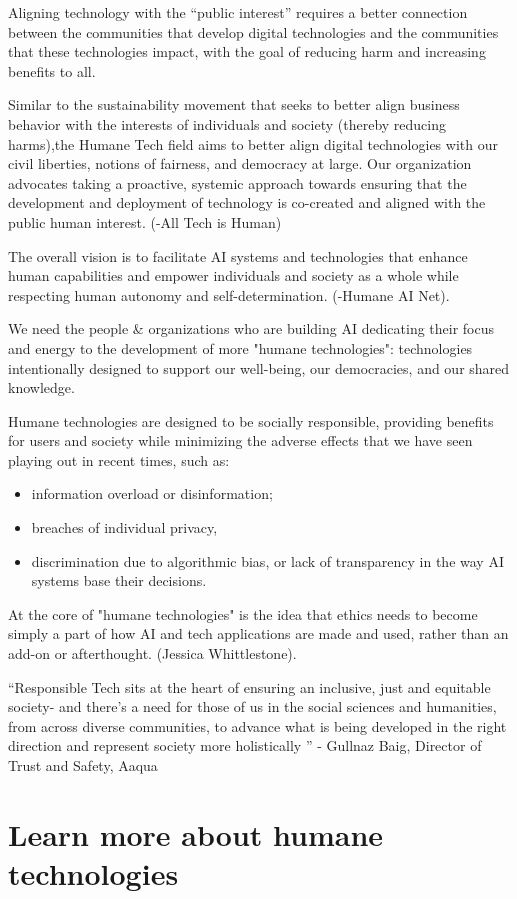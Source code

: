 \documentclass[11pt]{book} %
\begin{document}
		Aligning technology with the “public interest” requires a better connection between the communities that develop digital technologies and the communities that these technologies impact, with the goal of reducing harm and increasing benefits to all.
		 
		Similar to the sustainability movement that seeks to better align business behavior with the interests of individuals and society (thereby reducing harms),the Humane Tech field aims to better align digital technologies with our civil liberties, notions of fairness, and democracy at large. Our organization advocates taking a proactive, systemic approach towards ensuring that the development and deployment of technology is co-created and aligned with the public human interest. (-All Tech is Human)
		 
		The overall vision is to facilitate AI systems and technologies that enhance human capabilities and empower individuals and society as a whole while respecting human autonomy and self-determination.
		(-Humane AI Net).
		 
		We need the people \& organizations who are building AI dedicating their focus and energy to the development of more "humane technologies": technologies intentionally designed to support our well-being, our democracies, and our shared knowledge. 
		 
		Humane technologies are designed to be socially responsible, providing benefits for users and society while minimizing the adverse effects that we have seen playing out in recent times, such as:
		\begin{itemize} 
			\item information overload or disinformation; 
			\item breaches of individual privacy, 
			\item discrimination due to algorithmic bias, or lack of transparency in the way AI systems base their decisions. 
		\end{itemize}
		 
		At the core of "humane technologies" is the idea that ethics needs to become simply a part of how AI and tech applications are made and used, rather than an add-on or afterthought. (Jessica Whittlestone).
		 
		“Responsible Tech sits at the heart of ensuring an inclusive, just and equitable society- and there's a need for those of us in the social sciences and humanities, from across diverse communities, to advance what is being developed in the right direction and represent society more holistically ” - 
		Gullnaz Baig, Director of Trust and Safety, Aaqua
	\section{Learn more about humane technologies}
		

	
\end{document}
